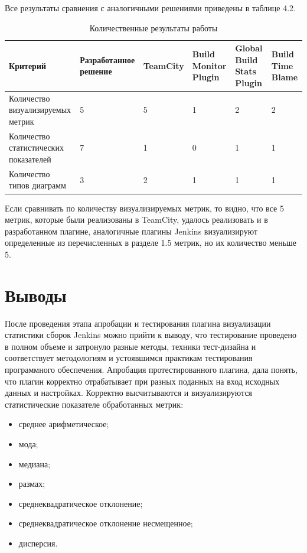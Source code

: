 Все результаты сравнения с аналогичными решениями приведены в таблице 4.2.

 \begin{table}
    \centering
    \caption{Количественные результаты работы}
    \begin{tabular}{|p{3cm}|p{3cm}|p{2cm}|p{2cm}|p{2cm}|p{2cm}|}
    \hline
        Критерий & Разработанное решение & TeamCity & Build Monitor Plugin & Global Build Stats Plugin  & Build Time Blame \\ \hline
        Количество визуализируемых метрик & 5 & 5 & 1 & 2 &2 \\ \hline
        Количество статистических показателей & 7 & 1 & 0 & 1 &1\\ \hline
        Количество типов диаграмм & 3 & 2 & 1 & 1 &1\\ \hline


    \end{tabular}
\end{table}

Если сравнивать по количеству визуализируемых метрик, то видно, что все 5 метрик, которые были реализованы в TeamCity, удалось реализовать и в разработанном плагине, аналогичные плагины Jenkins визуализируют определенные из перечисленных в разделе 1.5 метрик, но их количество меньше 5.


 
 
\section{Выводы} \label{ch4:sec3}

После проведения этапа апробации и тестирования плагина визуализации статистики сборок Jenkins можно прийти к выводу, что тестирование проведено в полном объеме и затронуло разные методы, техники тест-дизайна и соответствует методологиям и устоявшимся практикам тестирования программного обеспечения. Апробация протестированного плагина, дала понять, что плагин корректно отрабатывает при разных поданных на вход исходных данных и настройках. Корректно высчитываются и визуализируются статистические показателе обработанных метрик:

\begin{itemize}
	\item среднее арифметическое;
	\item мода;
	\item медиана;
	\item размах;
	\item среднеквадратическое отклонение;
	\item среднеквадратическое отклонение несмещенное;
	\item дисперсия.
\end{itemize}

